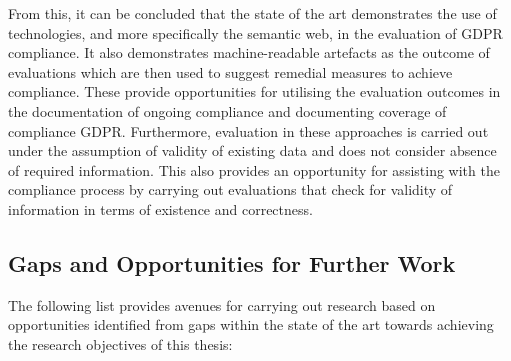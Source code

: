 From this, it can be concluded that the state of the art demonstrates the use of technologies, and more specifically the semantic web, in the evaluation of GDPR compliance. It also demonstrates machine-readable artefacts as the outcome of evaluations which are then used to suggest remedial measures to achieve compliance. These provide opportunities for utilising the evaluation outcomes in the documentation of ongoing compliance and documenting coverage of compliance GDPR. Furthermore, evaluation in these approaches is carried out under the assumption of validity of existing data and does not consider absence of required information. This also provides an opportunity for assisting with the compliance process by carrying out evaluations that check for validity of information in terms of existence and correctness.

\subsection{Gaps and Opportunities for Further Work}
The following list provides avenues for carrying out research based on opportunities identified from gaps within the state of the art towards achieving the research objectives of this thesis:
